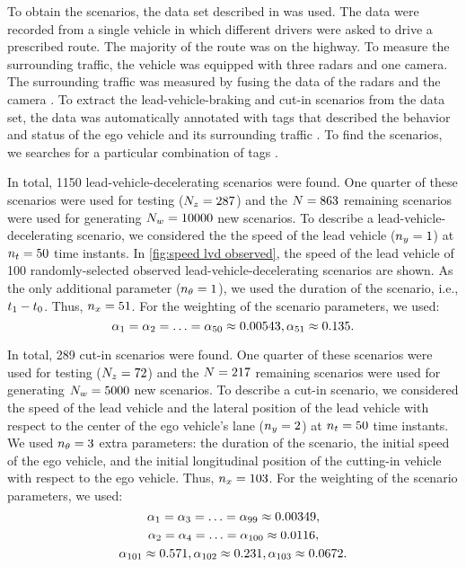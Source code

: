 To obtain the scenarios, the data set described in \autocite{paardekooper2019dataset6000km} was used. 
The data were recorded from a single vehicle in which different drivers were asked to drive a prescribed route. 
The majority of the route was on the highway.
To measure the surrounding traffic, the vehicle was equipped with three radars and one camera. 
The surrounding traffic was measured by fusing the data of the radars and the camera \autocite{elfring2016effective}.
To extract the lead-vehicle-braking and cut-in scenarios from the data set, the data was automatically annotated with tags that described the behavior and status of the ego vehicle and its surrounding traffic \autocite{degelder2020scenariomining}.
To find the scenarios, we searches for a particular combination of tags \autocite{degelder2020scenariomining}.

In total, 1150 lead-vehicle-decelerating scenarios were found. 
One quarter of these scenarios were used for testing ($N_z=287$) and the $N=863$ remaining scenarios were used for generating $N_w=10000$ new scenarios.
To describe a lead-vehicle-decelerating scenario, we considered the the speed of the lead vehicle ($n_y=1$) at $n_t=50$ time instants. 
In \cref{fig:speed lvd observed}, the speed of the lead vehicle of 100 randomly-selected observed lead-vehicle-decelerating scenarios are shown.
As the only additional parameter ($n_\theta=1$), we used the duration of the scenario, i.e., $t_1-t_0$.
Thus, $n_x=51$.
For the weighting of the scenario parameters, we used:
\begin{equation*}
	\alpha_{1}=\alpha_{2}=\ldots=\alpha_{50}\approx 0.00543, \alpha_{51}\approx 0.135.
\end{equation*}

In total, 289 cut-in scenarios were found. 
One quarter of these scenarios were used for testing ($N_z=72$) and the $N=217$ remaining scenarios were used for generating $N_w=5000$ new scenarios.
To describe a cut-in scenario, we considered the speed of the lead vehicle and the lateral position of the lead vehicle with respect to the center of the ego vehicle's lane ($n_y=2$) at $n_t=50$ time instants.
We used $n_\theta=3$ extra parameters: the duration of the scenario, the initial speed of the ego vehicle, and the initial longitudinal position of the cutting-in vehicle with respect to the ego vehicle.
Thus, $n_x=103$.
For the weighting of the scenario parameters, we used:
\begin{equation*}
	\alpha_{1}=\alpha_{3}=\ldots=\alpha_{99}\approx 0.00349,
\end{equation*}
\begin{equation*}
	\alpha_{2}=\alpha_{4}=\ldots=\alpha_{100}\approx 0.0116,
\end{equation*}
\begin{equation*}
	\alpha_{101}\approx 0.571, \alpha_{102}\approx 0.231, \alpha_{103}\approx 0.0672.
\end{equation*}



